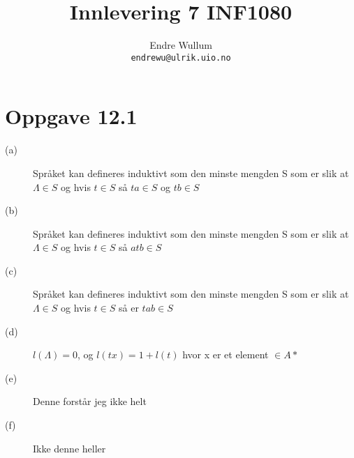 \documentclass[12pt,norsk,a4paper]{article}
\title{Innlevering 7 INF1080}
\author{Endre Wullum\\ \texttt{endrewu@ulrik.uio.no}}
\begin{document}
\maketitle

\section*{Oppgave 12.1}
\begin{description}
\item[(a)] Språket kan defineres induktivt som den minste mengden S som er slik at $\Lambda \in S$ og hvis $t \in S$ så $ta \in S$ og $tb \in S$
\item[(b)] Språket kan defineres induktivt som den minste mengden S som er slik at $\Lambda \in S$ og hvis $t \in S$ så $atb \in S$
\item[(c)] Språket kan defineres induktivt som den minste mengden S som er slik at $\Lambda \in S$ og hvis $t \in S$ så er $tab \in S$
\item[(d)]$l(\Lambda) = 0$, og $l(tx) = 1 + l(t)$ hvor x er et element $\in A*$
\item[(e)]Denne forstår jeg ikke helt
\item[(f)]Ikke denne heller
\end{description}


\end{document}
